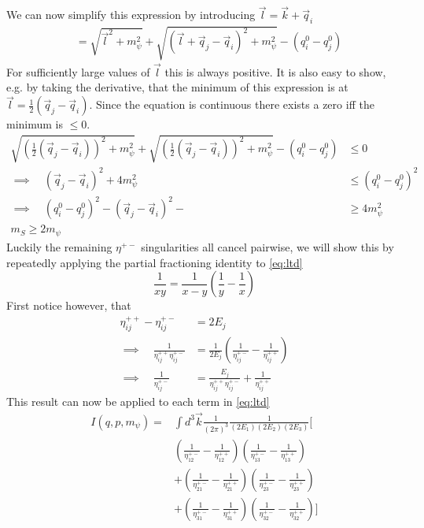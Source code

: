 We can now simplify this expression by introducing $\vec{l} = \vec{k}+\vec{q}_i$
\begin{align}
    &= \sqrt{\vec{l}^2+m_\psi^2} + \sqrt{(\vec{l}+\vec{q}_j-\vec{q}_i)^2+m_\psi^2} - (q^0_i - q^0_j)
\end{align}
For sufficiently large values of $\vec{l}$ this is always positive. It is also easy to show, e.g. by taking the derivative, that the minimum of this expression is at $\vec{l} = \frac{1}{2} (\vec{q}_j-\vec{q}_i)$. Since the equation is continuous there exists a zero iff the minimum is $\leq 0$.
\begin{align}
    \sqrt{(\frac{1}{2} (\vec{q}_j-\vec{q}_i))^2+m_\psi^2} + \sqrt{(\frac{1}{2}(\vec{q}_j-\vec{q}_i))^2+m_\psi^2} - (q^0_i - q^0_j) &\leq 0\\
    \implies\quad (\vec{q}_j-\vec{q}_i)^2 + 4 m_\psi^2 &\leq (q^0_i - q^0_j)^2\\
    \implies\quad (q^0_i - q^0_j)^2 - (\vec{q}_j-\vec{q}_i)^2 -  &\geq 4 m_\psi^2\\
    m_S \geq 2 m_\psi
\end{align}
Luckily the remaining $\eta^{+-}$ singularities all cancel pairwise, we will show this by repeatedly applying the partial fractioning identity to \eqref{eq:ltd}
\begin{equation}
    \frac{1}{xy} = \frac{1}{x-y}\left(\frac{1}{y}-\frac{1}{x}\right)
\end{equation}
First notice however, that
\begin{align}
    \eta^{++}_{ij}-\eta^{+-}_{ij} &= 2E_j\\
    \implies \quad \frac{1}{\eta^{++}_{ij}\eta^{+-}_{ij}} &= \frac{1}{2E_j}\left(\frac{1}{\eta^{+-}_{ij}} - \frac{1}{\eta^{++}_{ij}}\right)\\
    \implies \quad \frac{1}{\eta^{+-}_{ij}} &= \frac{E_j}{\eta^{++}_{ij}\eta^{+-}_{ij}} + \frac{1}{\eta^{++}_{ij}}
\end{align}
This result can now be applied to each term in \eqref{eq:ltd}
\begin{align*}
    I(q,p,m_\psi) =& \int d^3 \vec{k} \frac{1}{(2\pi)^3} \frac{1}{(2E_1)(2E_2)(2E_3)}\Bigg[\\
      &  \left(\frac{1}{\eta_{12}^{+-}}-\frac{1}{\eta_{12}^{++}}\right)\left(\frac{1}{\eta_{13}^{+-}}-\frac{1}{\eta_{13}^{++}}\right)\\
      &+ \left(\frac{1}{\eta_{21}^{+-}}-\frac{1}{\eta_{21}^{++}}\right)\left(\frac{1}{\eta_{23}^{+-}}-\frac{1}{\eta_{23}^{++}}\right)\\
      &+ \left(\frac{1}{\eta_{31}^{+-}}-\frac{1}{\eta_{31}^{++}}\right)\left(\frac{1}{\eta_{32}^{+-}}-\frac{1}{\eta_{32}^{++}}\right)
    \Bigg]
\end{align*}
